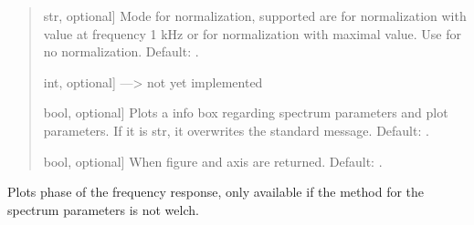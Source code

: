 \documentclass[letterpaper,10pt,english]{sphinxmanual}
\begin{document}
\begin{fulllineitems}
\begin{fulllineitems}
\begin{quote}
\begin{description}
\begin{description}
\sphinxlineitem{\sphinxstylestrong{normalize}}{[}str, optional{]}
\sphinxAtStartPar
Mode for normalization, supported are  for normalization
with value at frequency 1 kHz or  for normalization with
maximal value. Use  for no normalization. Default: .

\sphinxlineitem{\sphinxstylestrong{smoothe}}{[}int, optional{]}
\sphinxAtStartPar
—\textendash{}\textgreater{} not yet implemented

\sphinxlineitem{\sphinxstylestrong{show\_info\_box}}{[}bool, optional{]}
\sphinxAtStartPar
Plots a info box regarding spectrum parameters and plot parameters.
If it is str, it overwrites the standard message.
Default: .

\sphinxlineitem{\sphinxstylestrong{returns}}{[}bool, optional{]}
\sphinxAtStartPar
When  figure and axis are returned. Default: .

\end{description}

\begin{description}
\end{description}

\end{description}\end{quote}

\end{fulllineitems}


\begin{fulllineitems}
\label{\detokenize{classes:dsptools.classes.signal_class.Signal.plot_phase}}
\pysigstartsignatures
{}
\pysigstopsignatures
\sphinxAtStartPar
Plots phase of the frequency response, only available if the method
for the spectrum parameters is not welch.


\end{fulllineitems}
\end{fulllineitems}
\end{document}
